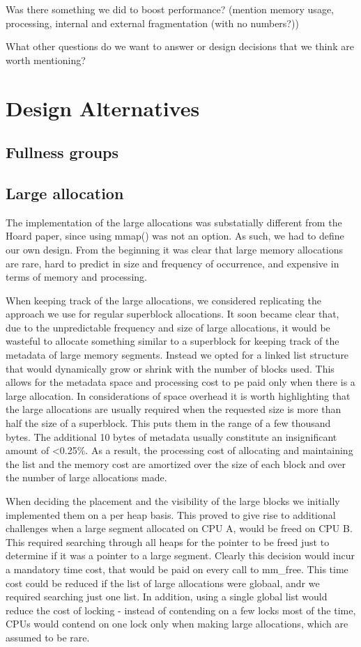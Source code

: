 \documentclass{article}
\begin{document}
Was there something we did to boost performance? (mention memory usage, 
processing, internal and external fragmentation (with no numbers?))

What other questions do we want to answer or design decisions that we think
are worth mentioning?

\newpage
\section{Design Alternatives}
\label{sec:alternatives}

\subsection{Fullness groups}

\subsection{Large allocation}
The implementation of the large allocations was substatially different from
the Hoard paper, since using mmap() was not an option. As such, we had to
define our own design. From the beginning it was clear that large memory 
allocations are rare, hard to predict in size and frequency of occurrence, and
expensive in terms of memory and processing.

When keeping track of the large allocations, we considered replicating the
approach we use for regular superblock allocations. It soon became clear that, 
due to the unpredictable frequency and size of large allocations, it would be 
wasteful to allocate something similar to a superblock for keeping track of the
metadata of large memory segments. Instead we opted for a linked list structure
that would dynamically grow or shrink with the number of blocks used. This 
allows for the metadata space and processing cost to pe paid only when there 
is a large allocation. In considerations of space overhead it is worth 
highlighting that the large allocations are usually required when the requested 
size is more than half the size of a superblock. This puts them in the range of 
a few thousand bytes. The additional 10 bytes of metadata usually constitute an 
insignificant amount of \textless 0.25\%. As a result, the processing cost of
allocating and maintaining the list and the memory cost are amortized over the 
size of each block and over the number of large allocations made.

When deciding the placement and the visibility of the large blocks we initially
implemented them on a per heap basis. This proved to give rise to additional
challenges when a large segment allocated on CPU A, would be freed on CPU B.
This required searching through all heaps for the pointer to be freed just to 
determine if it was a pointer to a large segment. Clearly this decision would 
incur a mandatory time cost, that would be paid on every call to mm\_free. 
This time cost could be reduced if the list of large allocations were globaal, 
andr we required searching just one list. In addition, using a single global
list would reduce the cost of locking - instead of contending on a few locks 
most of the time, CPUs would contend on one lock only when making large 
allocations, which are assumed to be rare.
\end{document}
